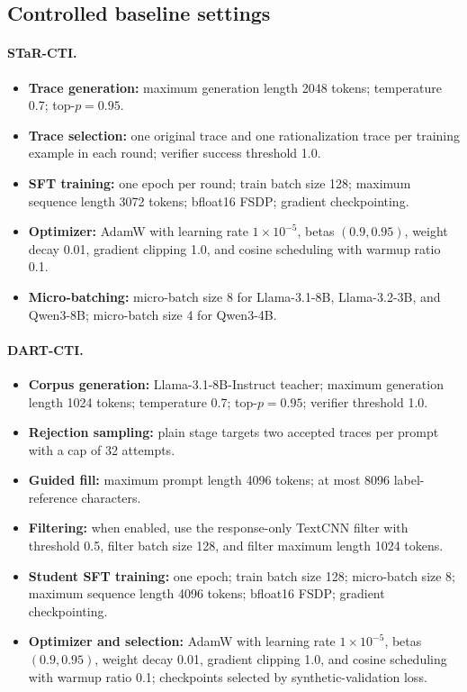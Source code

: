 \subsection{Controlled baseline settings}
\label{app:controlled-baseline-settings}

\paragraph{STaR-CTI.}
\begin{itemize}
  \item \textbf{Trace generation:} maximum generation length 2048 tokens; temperature 0.7; top-$p=0.95$.
  \item \textbf{Trace selection:} one original trace and one rationalization trace per training example in each round; verifier success threshold 1.0.
  \item \textbf{SFT training:} one epoch per round; train batch size 128; maximum sequence length 3072 tokens; bfloat16 FSDP; gradient checkpointing.
  \item \textbf{Optimizer:} AdamW with learning rate $1\times10^{-5}$, betas $(0.9,0.95)$, weight decay 0.01, gradient clipping 1.0, and cosine scheduling with warmup ratio 0.1.
  \item \textbf{Micro-batching:} micro-batch size 8 for Llama-3.1-8B, Llama-3.2-3B, and Qwen3-8B; micro-batch size 4 for Qwen3-4B.
\end{itemize}

\paragraph{DART-CTI.}
\begin{itemize}
  \item \textbf{Corpus generation:} Llama-3.1-8B-Instruct teacher; maximum generation length 1024 tokens; temperature 0.7; top-$p=0.95$; verifier threshold 1.0.
  \item \textbf{Rejection sampling:} plain stage targets two accepted traces per prompt with a cap of 32 attempts.
  \item \textbf{Guided fill:} maximum prompt length 4096 tokens; at most 8096 label-reference characters.
  \item \textbf{Filtering:} when enabled, use the response-only TextCNN filter with threshold 0.5, filter batch size 128, and filter maximum length 1024 tokens.
  \item \textbf{Student SFT training:} one epoch; train batch size 128; micro-batch size 8; maximum sequence length 4096 tokens; bfloat16 FSDP; gradient checkpointing.
  \item \textbf{Optimizer and selection:} AdamW with learning rate $1\times10^{-5}$, betas $(0.9,0.95)$, weight decay 0.01, gradient clipping 1.0, and cosine scheduling with warmup ratio 0.1; checkpoints selected by synthetic-validation loss.
\end{itemize}


